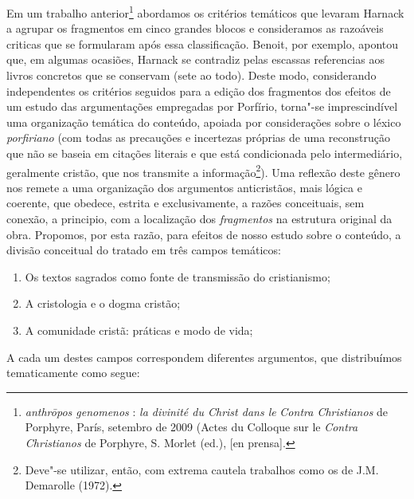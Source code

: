 Em um trabalho anterior\footnote{\textit{anthrōpos genomenos} : \textit{la divinité du Christ dans le} \textit{Contra
Christianos} de Porphyre{\textquotedbl}, París, setembro de 2009 (Actes
du Colloque sur le \textit{Contra Christianos} de Porphyre, S. Morlet
(ed.), [en prensa].} abordamos os critérios temáticos que levaram
Harnack a agrupar os fragmentos em cinco grandes blocos e consideramos
as razoáveis criticas que se formularam após essa classificação.
Benoit, por exemplo, apontou que, em algumas ocasiões, Harnack se
contradiz pelas escassas referencias aos livros concretos que se
conservam (sete ao todo). Deste modo, considerando independentes os
critérios seguidos para a edição dos fragmentos dos efeitos de um
estudo das argumentações empregadas por Porfírio, torna"-se
imprescindível uma organização temática do conteúdo, apoiada por
considerações sobre o léxico \textit{porfiriano }(com todas as
precauções e incertezas próprias de uma reconstrução que não se baseia
em citações literais e que está condicionada pelo intermediário,
geralmente cristão, que nos transmite a informação\footnote{ Deve"-se
utilizar, então, com extrema cautela trabalhos como os de J.M.
Demarolle (1972). }). Uma reflexão deste gênero nos remete a uma
organização dos argumentos anticristãos, mais lógica e coerente, que
obedece, estrita e exclusivamente, a razões conceituais, sem conexão, a
principio, com a localização dos \textit{fragmentos} na estrutura
original da obra. Propomos, por esta razão, para efeitos de nosso
estudo sobre o conteúdo, a divisão conceitual do tratado em três campos
temáticos:

\begin{enumerate}
\item Os textos sagrados como fonte de transmissão do cristianismo; 

\item A cristologia e o dogma cristão;

\item A comunidade cristã: práticas e modo de vida;
\end{enumerate}

A cada um destes campos correspondem diferentes argumentos, que
distribuímos tematicamente como segue:


